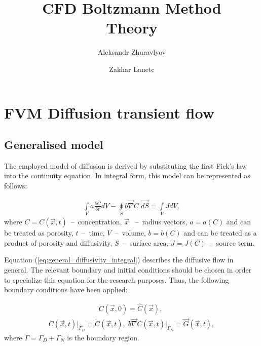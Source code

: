 \documentclass[a4paper,14pt,english]{extreport}
\author{Aleksandr Zhuravlyov \and Zakhar Lanetc}
\title{CFD Boltzmann Method\\Theory}
\date{\DTMnow}
\begin{document}
    \pagecolor{pageColor}
    \color{fontColor}

    \section*{FVM Diffusion transient flow}
    \subsection*{Generalised model}
    
The employed model of diffusion is derived by substituting the first Fick's law into the continuity equation. In integral form, this model can be represented as follows:

    \begin{eqnarray}
        \label{eq:general_diffusivity_integral}
        \int \limits_{V} a \frac{\partial C}{\partial t} d V - \oint \limits_{S} b \vec{\nabla}C \; \vec{dS} = \int \limits_{V} JdV,
    \end{eqnarray}
    where $C = C\left(\vec{x}, t\right)$~--~concentration, $\vec{x}$ ~--~radius vectors, $a = a\left(C\right)$ and can be treated as porosity, $t$~--~time, $V$~--~volume, $b = b\left(C\right)$ and can be treated as a product of porosity and diffusivity, $S$~--~surface area, $J=J\left(C\right)$~--~source term.
    
Equation (\ref{eq:general_diffusivity_integral}) describes the diffusive flow in general. The relevant boundary and initial conditions should be chosen in order to specialize this equation for the research purposes. Thus, the following boundary conditions have been applied:
    
    \begin{eqnarray}
        \label{eq:general_diffusivity_init}
        C\left(\vec{x}, \mathit{0}\right) = \hat{C}\left(\vec{x}\right), \; 
     \end{eqnarray}
    \begin{eqnarray}
      \label{eq:general_diffusivity_bound}
       C\left(\vec{x}, t\right)\Big|_{\mathit{\Gamma}_D} \!\!= \tilde{C}\left(\vec{x}, t\right), \; b \vec{\nabla}C \left(\vec{x}, t\right)\Big|_{\mathit{\Gamma}_N} \!\!= \vec{G}\left(\vec{x}, t\right),
    \end{eqnarray}
where $\mathit{\Gamma} = \mathit{\Gamma_D} + \mathit{\Gamma_N}$ is the boundary region.
\end{document}
